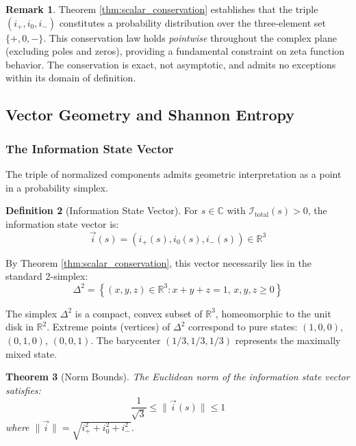 \documentclass[12pt]{article}
\theoremstyle{plain}
\newtheorem{theorem}{Theorem}[section]
\theoremstyle{definition}
\newtheorem{definition}[theorem]{Definition}
\newtheorem{remark}[theorem]{Remark}
\begin{document}
\begin{remark}
Theorem \ref{thm:scalar_conservation} establishes that the triple $(i_+, i_0, i_-)$ constitutes a probability distribution over the three-element set $\{+, 0, -\}$. This conservation law holds \emph{pointwise} throughout the complex plane (excluding poles and zeros), providing a fundamental constraint on zeta function behavior. The conservation is exact, not asymptotic, and admits no exceptions within its domain of definition.
\end{remark}

\subsection{Vector Geometry and Shannon Entropy}

\subsubsection{The Information State Vector}

The triple of normalized components admits geometric interpretation as a point in a probability simplex.

\begin{definition}[Information State Vector]\label{def:state_vector}
For $s \in \mathbb{C}$ with $\mathcal{I}_{\text{total}}(s) > 0$, the information state vector is:
\begin{equation}
\vec{i}(s) = \left(i_+(s), i_0(s), i_-(s)\right) \in \mathbb{R}^3
\end{equation}
\end{definition}

By Theorem \ref{thm:scalar_conservation}, this vector necessarily lies in the standard 2-simplex:
\begin{equation}
\Delta^2 = \left\{(x, y, z) \in \mathbb{R}^3 : x + y + z = 1, \, x, y, z \geq 0\right\}
\end{equation}

The simplex $\Delta^2$ is a compact, convex subset of $\mathbb{R}^3$, homeomorphic to the unit disk in $\mathbb{R}^2$. Extreme points (vertices) of $\Delta^2$ correspond to pure states: $(1,0,0)$, $(0,1,0)$, $(0,0,1)$. The barycenter $(1/3, 1/3, 1/3)$ represents the maximally mixed state.

\begin{theorem}[Norm Bounds]\label{thm:norm_bounds}
The Euclidean norm of the information state vector satisfies:
\begin{equation}
\frac{1}{\sqrt{3}} \leq \|\vec{i}(s)\| \leq 1
\end{equation}
where $\|\vec{i}\| = \sqrt{i_+^2 + i_0^2 + i_-^2}$.
\end{theorem}
\end{document}
